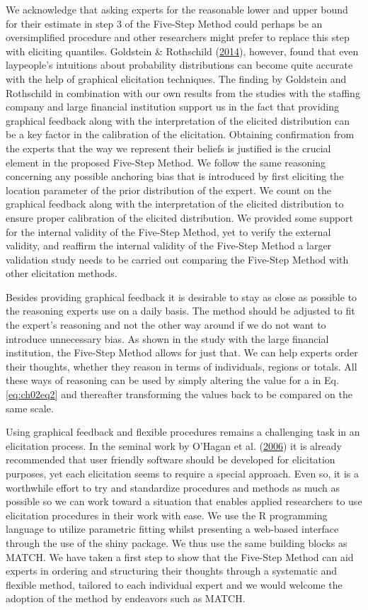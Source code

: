 \documentclass[openright,titlepage,12pt,a4paper]{book}
\begin{document}
We acknowledge that asking experts for the reasonable lower and upper bound for their estimate in step 3 of the Five-Step Method could perhaps be an oversimplified procedure and other researchers might prefer to replace this step with eliciting quantiles. Goldstein \& Rothschild (\protect\hyperlink{ref-goldstein_lay_2014}{2014}), however, found that even laypeople's intuitions about probability distributions can become quite accurate with the help of graphical elicitation techniques. The finding by Goldstein and Rothschild in combination with our own results from the studies with the staffing company and large financial institution support us in the fact that providing graphical feedback along with the interpretation of the elicited distribution can be a key factor in the calibration of the elicitation. Obtaining confirmation from the experts that the way we represent their beliefs is justified is the crucial element in the proposed Five-Step Method. We follow the same reasoning concerning any possible anchoring bias that is introduced by first eliciting the location parameter of the prior distribution of the expert. We count on the graphical feedback along with the interpretation of the elicited distribution to ensure proper calibration of the elicited distribution. We provided some support for the internal validity of the Five-Step Method, yet to verify the external validity, and reaffirm the internal validity of the Five-Step Method a larger validation study needs to be carried out comparing the Five-Step Method with other elicitation methods.

Besides providing graphical feedback it is desirable to stay as close as possible to the reasoning experts use on a daily basis. The method should be adjusted to fit the expert's reasoning and not the other way around if we do not want to introduce unnecessary bias. As shown in the study with the large financial institution, the Five-Step Method allows for just that. We can help experts order their thoughts, whether they reason in terms of individuals, regions or totals. All these ways of reasoning can be used by simply altering the value for a in Eq. \eqref{eq:ch02eq2} and thereafter transforming the values back to be compared on the same scale.

Using graphical feedback and flexible procedures remains a challenging task in an elicitation process. In the seminal work by O'Hagan et al. (\protect\hyperlink{ref-ohagan_uncertain_2006}{2006}) it is already recommended that user friendly software should be developed for elicitation purposes, yet each elicitation seems to require a special approach. Even so, it is a worthwhile effort to try and standardize procedures and methods as much as possible so we can work toward a situation that enables applied researchers to use elicitation procedures in their work with ease. We use the R programming language to utilize parametric fitting whilst presenting a web-based interface through the use of the shiny package. We thus use the same building blocks as MATCH. We have taken a first step to show that the Five-Step Method can aid experts in ordering and structuring their thoughts through a systematic and flexible method, tailored to each individual expert and we would welcome the adoption of the method by endeavors such as MATCH.
\end{document}
